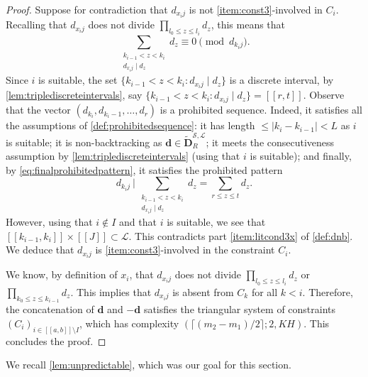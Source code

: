 \documentclass[11pt]{amsart}
\theoremstyle{definition}
\renewcommand{\leq}{\leqslant}
\newcommand{\interval}[2]{[\![#1,#2]\!] }
\newcommand{\sinterval}[1]{[\![#1]\!] }
\newcommand{\abs}[1]{\left|#1\right|}
\renewcommand{\d}{\boldsymbol{d}}
\newcommand{\pcomp}[2]{d_{#1#2}}
\newcommand{\bmid}{\  \Big\vert}
\newcommand{\lit}{\mathcal{L}}
\newcommand{\s}{\mathcal{S}}
\newcommand{\fancyD}{\mathbf{D}}
\newcommand{\Dnb}{\widetilde{\fancyD}^{\s,\lit}_{\!\tupsize}}
\newcommand{\elln}{L}
\newcommand{\repK}{K}
\newcommand{\newR}{\sinterval{J}}
\newcommand{\tupsize}{R}
\begin{document}
\begin{proof}
Suppose for contradiction that $\pcomp{x_i}{j}$ is not \cref{item:const3}-involved in $C_i$. Recalling that $\pcomp{x_i}{j}$ does not divide $\prod_{l_0\leq z\leq l_i} d_{z}$, this means that 
\begin{equation}
\label{eq:finalprohibitedpattern}
	\sum_{\substack{k_{i-1}<z<k_i\\ \pcomp{x_i}{j}\mid d_z}}d_z \equiv 0 \pmod{\pcomp{k_i}{j}}.
\end{equation}
Since $i$ is suitable, the set $\{k_{i-1}<z< k_i: \pcomp{x_i}{j}\mid d_z\}$ is a discrete interval, by \cref{lem:triplediscreteintervals}, say $\{k_{i-1}<z< k_i: \pcomp{x_i}{j}\mid d_z\} = \interval{r}{t}$. Observe that the vector $(d_{k_i}, d_{k_i-1}, \ldots, d_{r})$ is a prohibited sequence. Indeed, it satisfies all the assumptions of \cref{def:prohibitedsequence}: it has length $\leq \abs{k_i-k_{i-1}}< \elln$ as $i$ is suitable; it is non-backtracking as $\d\in \Dnb$; it meets the consecutiveness assumption by \cref{lem:triplediscreteintervals} (using that $i$ is suitable); and finally, by \cref{eq:finalprohibitedpattern}, it satisfies the prohibited pattern 
\begin{equation*}
	\pcomp{k_i}{j} \bmid\,\sum_{\substack{k_{i-1}<z<k_i\\ \pcomp{x_i}{j}\mid d_z}}d_z  = \sum_{r\leq z\leq t} d_z.
\end{equation*}
However, using that $i\not\in I$ and that $i$ is suitable, we see that $\interval{k_{i-1}}{k_i}\times \newR\subset \lit$. This contradicts  part \cref{item:litcond3x} of \cref{def:dnb}. We deduce that $\pcomp{x_i}{j}$ is \cref{item:const3}-involved in the constraint $C_i$.

We know, by definition of $x_i$, that $\pcomp{x_i}{j}$ does not divide $\prod_{l_0\leq z\leq l_i} d_{z}$ or $\prod_{k_0\leq z \leq k_{i-1}} d_z$. This implies that $\pcomp{x_i}{j}$ is absent from $C_{k}$ for all $k<i$. Therefore, the concatenation of $\d$ and $-\d$ satisfies the triangular system of constraints $(C_i)_{i\in \interval{a}{b}\setminus I}$, which has complexity $(\lceil(m_2-m_1)/2 \rceil ;2,\repK H)$. This concludes the proof.
\end{proof}

We recall \cref{lem:unpredictable}, which was our goal for this section.

\unpredcontrib*
\end{document}
